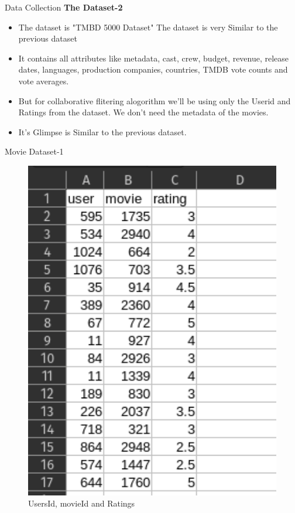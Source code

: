 \documentclass{beamer}
\begin{document}
\begin{frame}{Data Collection}
    \textbf{The Dataset-2}
      \begin{itemize}
     \item The dataset is "TMBD 5000 Dataset" The dataset is very Similar to the previous dataset
     \item It contains all attributes like metadata, cast, crew, budget, revenue, release dates, languages, production companies, countries, TMDB vote counts and vote averages.
     \item But for collaborative flitering alogorithm we'll be using only the Userid and Ratings from the dataset. We don't need the metadata of the movies.
     \item It's Glimpse is Similar to the previous dataset.
 \end{itemize}
 \end{frame}

\begin{frame}{Movie Dataset-1}
\begin{figure}[htp]
\includegraphics[width=1.05\textwidth]{dataset.png}
\caption{UsersId, movieId and Ratings}
\end{figure}  
\end{frame}
\end{document}
